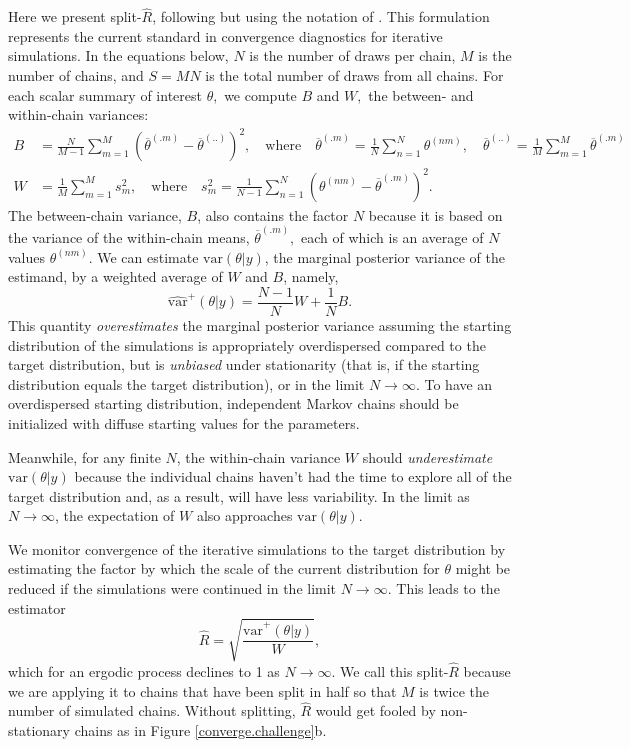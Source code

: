 \documentclass[american,]{article}
\theoremstyle{definition}
\begin{document}
Here we present split-\(\widehat{R}\),
following \citet{BDA3} but using the notation of
\citet{StanManual.2.18.0}. This formulation represents the current 
standard in convergence diagnostics for iterative simulations. In the
equations below, \(N\) is the number of draws per chain, \(M\) is the
number of chains, and \(S=MN\) is the total number of draws from all
chains. For each scalar summary of interest \(\theta,\) we compute \(B\)
and \(W,\) the between- and within-chain variances:
\begin{align}
B &= \frac{N}{M-1}\sum_{m=1}^{M}(\overline{\theta}^{(.m)} - 
\overline{\theta}^{(..)})^2, \quad \mbox{where} \quad 
\overline{\theta}^{(.m)}=\frac{1}{N}\sum_{n=1}^N \theta^{(nm)}, \quad
\overline{\theta}^{(..)} = \frac{1}{M}\sum_{m=1}^M\overline{\theta}^{(.m)} 
\\
W &= \frac{1}{M}\sum_{m=1}^{M}s_m^2, \quad \mbox{where} \quad
s_m^2=\frac{1}{N-1} \sum_{n=1}^N (\theta^{(nm)}-\overline{\theta}^{(.m)})^2.
\end{align}
The between-chain variance, \(B\), also contains the factor \(N\)
because it is based on the variance of the within-chain means,
\(\overline{\theta}^{(.m)},\) each of which is an average of \(N\)
values \(\theta^{(nm)}\). We can estimate \(\mbox{var}(\theta | y)\),
the marginal posterior variance of the estimand, by a weighted average
of \(W\) and \(B\), namely,
\begin{equation}
\widehat{\mbox{var}}^+(\theta| y) = \frac{N-1}{N}W + \frac{1}{N}B.
\end{equation}
This quantity \emph{overestimates} the marginal posterior variance
assuming the starting distribution of the simulations is appropriately
overdispersed compared to the target distribution, but is
\emph{unbiased} under stationarity (that is, if the starting
distribution equals the target distribution), or in the limit
\(N\rightarrow\infty\). To have an overdispersed starting distribution,
independent Markov chains should be initialized with diffuse starting
values for the parameters. 

Meanwhile, for any finite \(N\), the within-chain variance \(W\) should
\emph{underestimate} \(\mbox{var}(\theta |y)\) because the
individual chains haven't had the time to explore all of the target
distribution and, as a result, will have less variability. In the limit
as \(N\rightarrow\infty\), the expectation of \(W\) also approaches
\(\mbox{var}(\theta |y)\).

We monitor convergence of the iterative simulations to the target
distribution by estimating the factor by which the scale of the current
distribution for \(\theta\) might be reduced if the simulations were
continued in the limit \(N\rightarrow\infty\). This leads to the estimator
\begin{equation}
\widehat{R} = \sqrt{\frac{\widehat{\mbox{var}}^+(\theta | y)}{W}},
\end{equation}
which for an ergodic process declines to 1 as \(N\rightarrow\infty\). We call this
split-\(\widehat{R}\) because we are applying it to chains that
have been split in half so that \(M\) is twice the number of simulated
chains. Without splitting, \(\widehat{R}\) would get fooled by
non-stationary chains as in Figure \ref{converge.challenge}b.
\end{document}
